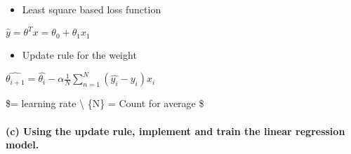 \documentclass[11pt]{article}
\providecommand{\tightlist}{%
      \setlength{\itemsep}{0pt}\setlength{\parskip}{0pt}}
\begin{document}
\begin{itemize}
\tightlist
\item
  Least square based loss function
\end{itemize}

\(\hat{y} = \theta^{T} x = \theta_0 + \theta_1 x_1\)

\begin{itemize}
\tightlist
\item
  Update rule for the weight
\end{itemize}

\(\hat{\theta_{i+1}} = \hat{\theta_i} - \alpha\frac{1}{N}{{\sum}}_{n=1}^{N}( \hat{y_i} - y_i) {x_i}\)

\$\alpha = learning rate \textbackslash{} \{N\} = Count for average \$

\paragraph{(c) Using the update rule, implement and train the linear
regression
model.}\label{c-using-the-update-rule-implement-and-train-the-linear-regression-model.}
\end{document}
